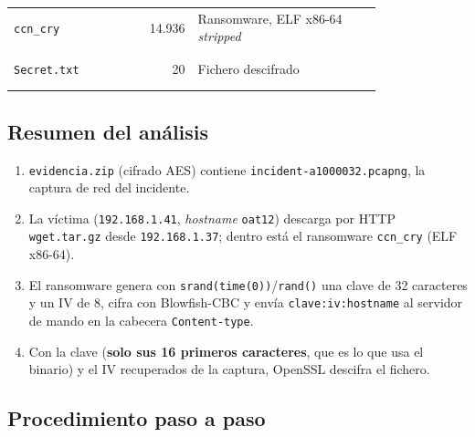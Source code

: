 \documentclass[11pt,a4paper]{article}
\begin{document}
\begin{longtable}{@{}L{0.30\linewidth}r L{0.50\linewidth}@{}}
\texttt{ccn\_cry} & 14.936 & Ransomware, ELF x86-64 \emph{stripped} \\ \nopagebreak
{} \\ \nopagebreak
{} \\ \midrule
\texttt{Secret.txt} & 20 & Fichero descifrado \\ \nopagebreak
{} \\ \nopagebreak
{} \\ \midrule
\end{longtable}

\subsection{Resumen del análisis}
\begin{enumerate}
  \item \texttt{evidencia.zip} (cifrado AES) contiene \texttt{incident-a1000032.pcapng}, la captura de red del incidente.
  \item La víctima (\texttt{192.168.1.41}, \emph{hostname} \texttt{oat12}) descarga por HTTP \texttt{wget.tar.gz} desde
        \texttt{192.168.1.37}; dentro está el ransomware \texttt{ccn\_cry} (ELF x86-64).
  \item El ransomware genera con \texttt{srand(time(0))}/\texttt{rand()} una clave de 32 caracteres y un IV de 8, cifra
        con Blowfish-CBC y envía \texttt{clave:iv:hostname} al servidor de mando en la cabecera \texttt{Content-type}.
  \item Con la clave (\textbf{solo sus 16 primeros caracteres}, que es lo que usa el binario) y el IV recuperados de la
        captura, OpenSSL descifra el fichero.
\end{enumerate}

\subsection{Procedimiento paso a paso}
\end{document}
